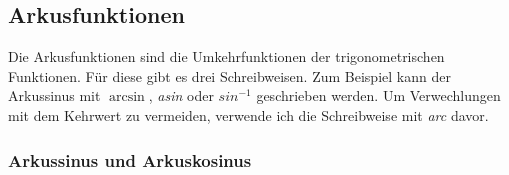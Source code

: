 \documentclass[a4paper]{article}
\begin{document}
\subsection{Arkusfunktionen}
Die Arkusfunktionen sind die Umkehrfunktionen der trigonometrischen Funktionen. Für diese gibt es drei Schreibweisen. Zum Beispiel kann der Arkussinus mit $ \arcsin $, \textit{asin} oder $ sin^{-1} $ geschrieben werden. Um Verwechlungen mit dem Kehrwert zu vermeiden, verwende ich die Schreibweise mit \textit{arc} davor.

\subsubsection{Arkussinus und Arkuskosinus}
\end{document}
